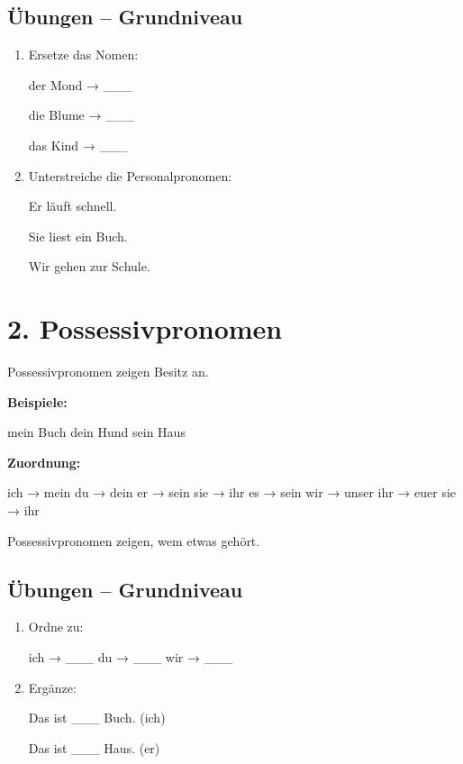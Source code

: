 \documentclass[a4paper,12pt]{article}
\begin{document}
\subsection*{Übungen – Grundniveau}

\begin{enumerate}
\item Ersetze das Nomen:

der Mond → \_\_\_

die Blume → \_\_\_

das Kind → \_\_\_

\item Unterstreiche die Personalpronomen:

Er läuft schnell.

Sie liest ein Buch.

Wir gehen zur Schule.
\end{enumerate}

\section*{2. Possessivpronomen}

Possessivpronomen zeigen Besitz an.

\textbf{Beispiele:}

mein Buch  
dein Hund  
sein Haus  

\textbf{Zuordnung:}

ich → mein  
du → dein  
er → sein  
sie → ihr  
es → sein  
wir → unser  
ihr → euer  
sie → ihr  

\begin{merksatz}
Possessivpronomen zeigen, wem etwas gehört.
\end{merksatz}

\subsection*{Übungen – Grundniveau}

\begin{enumerate}
\item Ordne zu:

ich → \_\_\_  
du → \_\_\_  
wir → \_\_\_  

\item Ergänze:

Das ist \_\_\_ Buch. (ich)

Das ist \_\_\_ Haus. (er)
\end{enumerate}
\end{document}
